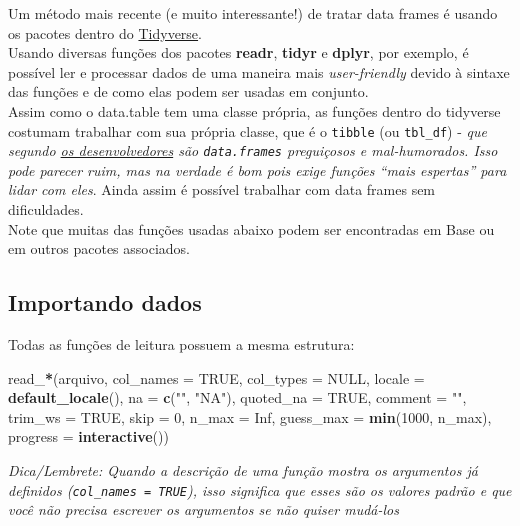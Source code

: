 \documentclass[]{book}
\newenvironment{Shaded}{\begin{snugshade}}{\end{snugshade}}
\newcommand{\KeywordTok}[1]{\textcolor[rgb]{0.13,0.29,0.53}{\textbf{#1}}}
\newcommand{\DataTypeTok}[1]{\textcolor[rgb]{0.13,0.29,0.53}{#1}}
\newcommand{\DecValTok}[1]{\textcolor[rgb]{0.00,0.00,0.81}{#1}}
\newcommand{\StringTok}[1]{\textcolor[rgb]{0.31,0.60,0.02}{#1}}
\newcommand{\OtherTok}[1]{\textcolor[rgb]{0.56,0.35,0.01}{#1}}
\newcommand{\OperatorTok}[1]{\textcolor[rgb]{0.81,0.36,0.00}{\textbf{#1}}}
\newcommand{\NormalTok}[1]{#1}
\theoremstyle{definition}
\theoremstyle{definition}
\theoremstyle{definition}
\theoremstyle{remark}
\begin{document}
Um método mais recente (e muito interessante!) de tratar data frames é
usando os pacotes dentro do
\href{https://www.tidyverse.org/}{Tidyverse}.\\
Usando diversas funções dos pacotes \textbf{readr}, \textbf{tidyr} e
\textbf{dplyr}, por exemplo, é possível ler e processar dados de uma
maneira mais \emph{user-friendly} devido à sintaxe das funções e de como
elas podem ser usadas em conjunto.\\
Assim como o data.table tem uma classe própria, as funções dentro do
tidyverse costumam trabalhar com sua própria classe, que é o
\texttt{tibble} (ou \texttt{tbl\_df}) - \emph{que segundo
\href{https://github.com/tidyverse/tibble}{os desenvolvedores} são
\texttt{data.frames} preguiçosos e mal-humorados. Isso pode parecer
ruim, mas na verdade é bom pois exige funções ``mais espertas'' para
lidar com eles}. Ainda assim é possível trabalhar com data frames sem
dificuldades.\\
Note que muitas das funções usadas abaixo podem ser encontradas em Base
ou em outros pacotes associados.

\subsection{Importando dados}\label{importando-dados}

Todas as funções de leitura possuem a mesma estrutura:

\begin{Shaded}
\begin{Highlighting}[]
\NormalTok{read_}\OperatorTok{*}\NormalTok{(arquivo, }
       \DataTypeTok{col_names =} \OtherTok{TRUE}\NormalTok{, }
       \DataTypeTok{col_types =} \OtherTok{NULL}\NormalTok{, }
       \DataTypeTok{locale =} \KeywordTok{default_locale}\NormalTok{(), }
       \DataTypeTok{na =} \KeywordTok{c}\NormalTok{(}\StringTok{""}\NormalTok{, }\StringTok{"NA"}\NormalTok{),}
       \DataTypeTok{quoted_na =} \OtherTok{TRUE}\NormalTok{, }
       \DataTypeTok{comment =} \StringTok{""}\NormalTok{, }
       \DataTypeTok{trim_ws =} \OtherTok{TRUE}\NormalTok{, }
       \DataTypeTok{skip =} \DecValTok{0}\NormalTok{, }
       \DataTypeTok{n_max =} \OtherTok{Inf}\NormalTok{, }
       \DataTypeTok{guess_max =} \KeywordTok{min}\NormalTok{(}\DecValTok{1000}\NormalTok{, n_max), }\DataTypeTok{progress =} \KeywordTok{interactive}\NormalTok{())}
\end{Highlighting}
\end{Shaded}

\emph{Dica/Lembrete: Quando a descrição de uma função mostra os
argumentos já definidos (\texttt{col\_names\ =\ TRUE}), isso significa
que esses são os valores padrão e que você não precisa escrever os
argumentos se não quiser mudá-los}
\end{document}
